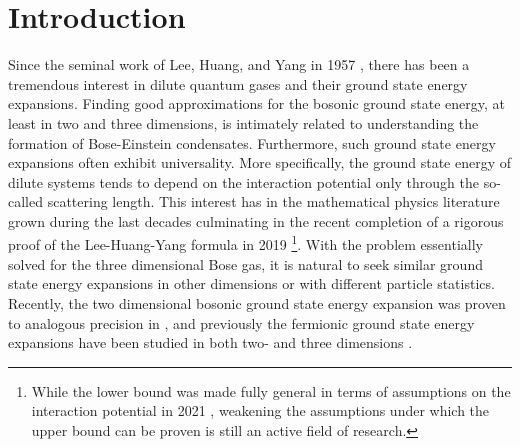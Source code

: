  \chapter{Introduction}
Since the seminal work of Lee, Huang, and Yang in 1957 \cite{lee1957eigenvalues, lee1957many, huang1957quantum}, there has been a tremendous interest in dilute quantum gases and their ground state energy expansions. Finding good approximations for the bosonic ground state energy, at least in two and three dimensions, is intimately related to understanding the formation of Bose-Einstein condensates. Furthermore, such ground state energy expansions often exhibit universality. More specifically, the ground state energy of dilute systems tends to depend on the interaction potential only through the so-called scattering length. This interest has in the mathematical physics literature grown during the last decades culminating in the recent completion of a rigorous proof of the Lee-Huang-Yang formula in 2019 \cite{yau2009second,fournais2020energy}\footnote{While the lower bound was made fully general in terms of assumptions on the interaction potential in 2021 \cite{fournais2021energy}, weakening the assumptions under which the upper bound can be proven is still an active field of research. }. With the problem essentially solved for the three dimensional Bose gas, it is natural to seek similar ground state energy expansions in other dimensions or with different particle statistics. Recently, the two dimensional bosonic ground state energy expansion was proven to analogous precision in \cite{fournais2022ground}, and previously the fermionic ground state energy expansions have been studied in both two- and three dimensions \cite{lieb2005ground}.

